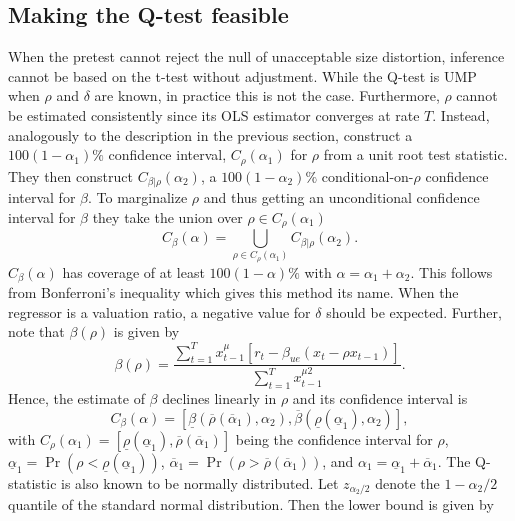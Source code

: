 \documentclass{article}
\begin{document}
\subsection{Making the Q-test feasible}
\label{Making the Q-test feasible}
When the pretest cannot reject the null of unacceptable size distortion, inference cannot be based on the t-test without adjustment. While the Q-test is UMP when $\rho$ and $\delta$ are known, in practice this is not the case. Furthermore, $\rho$ cannot be estimated consistently since its OLS estimator converges at rate $T$. Instead, analogously to the description in the previous section, \citet{campbell2006efficient} construct a $100\left(1-\alpha_{1}\right) \%$ confidence interval, $C_{\rho}\left(\alpha_{1}\right)$ for $\rho$ from a unit root test statistic. They then construct $C_{\beta | \rho}\left(\alpha_{2}\right)$, a $100\left(1-\alpha_{2}\right) \%$ conditional-on-$\rho$ confidence interval for $\beta$. To marginalize $\rho$ and thus getting an unconditional confidence interval for $\beta$ they take the union over $\rho \in C_{\rho}\left(\alpha_{1}\right)$
\begin{equation}
C_{\beta}(\alpha)=\bigcup_{\rho \in C_{\rho}\left(\alpha_{1}\right)} C_{\beta | \rho}\left(\alpha_{2}\right).
\end{equation}
$C_{\beta}(\alpha)$ has coverage of at least $100(1-\alpha) \%$ with $\alpha=\alpha_{1}+\alpha_{2}$. This follows from Bonferroni's inequality which gives this method its name.  
When the regressor is a valuation ratio, a negative value for $\delta$ should be expected. Further, note that $\beta(\rho)$ is given by 
\begin{equation}
\beta(\rho)=\frac{\sum_{t=1}^{T} x_{t-1}^{\mu}\left[r_{t}-\beta_{u e}\left(x_{t}-\rho x_{t-1}\right)\right]}{\sum_{t=1}^{T} x_{t-1}^{\mu 2}}.
\end{equation}
Hence, the estimate of $\beta$ declines linearly in $\rho$ and its confidence interval is 
\begin{equation}
C_{\beta}(\alpha)=\left[\underline{\beta}\left(\overline{\rho}\left(\overline{\alpha}_{1}\right), \alpha_{2}\right), \overline{\beta}\left(\underline{\rho}\left(\underline{\alpha}_{1}\right), \alpha_{2}\right)\right],
\end{equation}
with $C_{\rho}\left(\alpha_{1}\right)= \left[\underline{\rho}\left(\underline{\alpha}_{1}\right), \overline{\rho}\left(\overline{\alpha}_{1}\right)\right]$ being the confidence interval for $\rho$, $\underline{\alpha}_{1}=\operatorname{Pr}\left(\rho<\underline{\rho}\left(\underline{\alpha}_{1}\right)\right)$, $\overline{\alpha}_{1}=\operatorname{Pr}\left(\rho>\overline{\rho}\left(\overline{\alpha}_{1}\right)\right)$, and $\alpha_{1}=\underline{\alpha}_{1}+\overline{\alpha}_{1}$. The Q-statistic is also known to be normally distributed. Let $z_{\alpha_{2} / 2}$ denote the $1-\alpha_{2} / 2$ quantile of the standard normal distribution. Then the lower bound is given by
\end{document}
